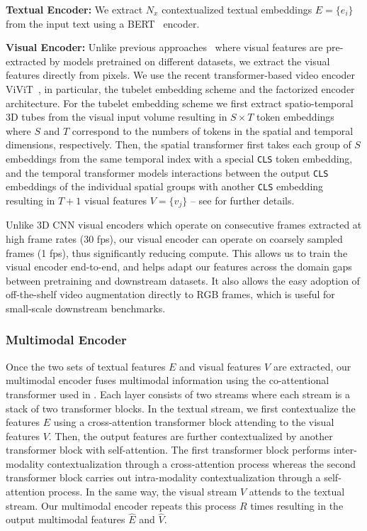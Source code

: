 \documentclass[10pt,twocolumn,letterpaper]{article}
\begin{document}
\noindent\textbf{Textual Encoder:} 
We extract $N_x$ contextualized textual embeddings $E=\{e_i\}$ from the input text using a BERT~\cite{devlin2018bert} encoder.

\noindent\textbf{Visual Encoder:} 
Unlike previous approaches~\cite{sun2019videobert, luo2020univl, huang2020multimodal, seo2021look} where visual features are pre-extracted by models pretrained on different datasets, we extract the visual features directly from pixels.
We use the recent transformer-based video encoder ViViT~\cite{arnab2021vivit}, in particular, the tubelet embedding scheme and the factorized encoder architecture. 
For the tubelet embedding scheme we first extract spatio-temporal 3D tubes from the visual input volume resulting in $S\times T$ token embeddings where $S$ and $T$ correspond to the numbers of tokens in the spatial and temporal dimensions, respectively.
Then, the spatial transformer first takes each group of $S$ embeddings from the same temporal index with a special \texttt{CLS} token embedding, and the temporal transformer models interactions between the output \texttt{CLS} embeddings of the individual spatial groups with another \texttt{CLS} embedding resulting in $T+1$ visual features $V=\{v_j\}$ -- see \cite{arnab2021vivit} for further details. 

Unlike 3D CNN visual encoders which operate on consecutive frames extracted at high frame rates (30 fps), our visual encoder can operate on coarsely sampled frames (1 fps), thus significantly reducing compute. This allows us to train the visual encoder end-to-end, and helps adapt our features across the domain gaps between pretraining and downstream datasets. It also allows the easy adoption of off-the-shelf video augmentation directly to RGB frames, which is useful for small-scale downstream benchmarks.

\subsubsection{Multimodal Encoder}
Once the two sets of textual features $E$ and visual features $V$ are extracted, our multimodal encoder fuses multimodal information using the co-attentional transformer used in \cite{lu2019vilbert,seo2021look}.
Each layer consists of two streams where each stream is a stack of two transformer blocks.
In the textual stream, we first contextualize the features $E$ using a cross-attention transformer block attending to the visual features $V$.
Then, the output features are further contextualized by another transformer block with self-attention.
The first transformer block performs inter-modality contextualization through a cross-attention process whereas the second transformer block carries out intra-modality contextualization through a self-attention process.
In the same way, the visual stream $V$ attends to the textual stream. 
Our multimodal encoder repeats this process $R$ times resulting in the output multimodal features $\hat{E}$ and $\hat{V}$.
\end{document}
